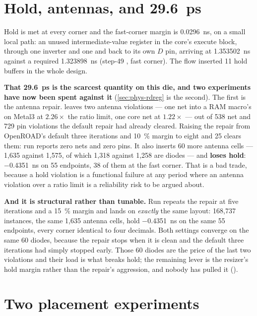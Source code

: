 \section{Hold, antennas, and \qty{29.6}{\pico\second}}

Hold is met at every corner and the fast-corner margin is
\qty{+0.0296}{\nano\second}, on a small local path: an unused
intermediate-value register in the core's execute block, through one
inverter and one  and back to its own $D$ pin,
arriving at \qty{1.353502}{\nano\second} against a required
\qty{1.323898}{\nano\second} (step-49 , fast corner). The
flow inserted 11 hold buffers in the whole design.

\textbf{That \qty{29.6}{\pico\second} is the scarcest quantity on this
die, and two experiments have now been spent against it}
(\cref{sec:phys-rdreg} is the second). The first is the antenna repair.  leaves two antenna violations ---
one net into a RAM macro's  on Metal3 at
$2.26\times$ the ratio limit, one core net at $1.22\times$ --- out of
538 net and 729 pin violations the default repair had already cleared.
Raising the repair from OpenROAD's default three iterations and
\qty{10}{\percent} margin to eight and \num{25} clears them: run
 reports zero nets and zero pins. It also inserts 60 more
antenna cells --- 1,635 against 1,575, of which 1,318 against 1,258 are
diodes --- and \textbf{loses hold}: \qty{-0.4351}{\nano\second} on 55
endpoints, 38 of them at the fast corner. That is a bad trade, because a
hold violation is a functional failure at any period where an antenna
violation over a ratio limit is a reliability risk to be argued about.

\textbf{And it is structural rather than tunable.} Run 
repeats the repair at five iterations and a \qty{15}{\percent} margin
and lands on \emph{exactly} the same layout: 168,737 instances, the same
1,635 antenna cells, hold \qty{-0.4351}{\nano\second} on the same 55
endpoints, every corner identical to four decimals. Both settings
converge on the same 60 diodes, because the repair stops when it is
clean and the default three iterations had simply stopped early. Those
60 diodes are the price of the last two violations and their load is
what breaks hold; the remaining lever is the resizer's hold margin
rather than the repair's aggression, and nobody has pulled it
().

\section{Two placement experiments}

